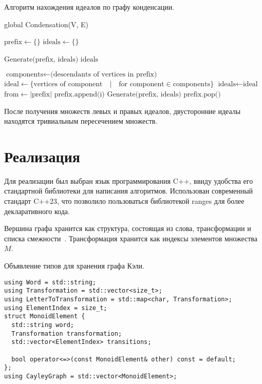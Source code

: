 \documentclass[14pt, russian]{scrartcl}
\begin{document}
\begin{listing}[!htb]
\caption{Алгоритм нахождения идеалов по графу конденсации.}
\label{lst:ideals}
\begin{algorithmic}[1]

\State global Condensation(V, E)

    \State $\text{prefix} \gets \{\}$
    \State $\text{ideals} \gets \{\}$

    \State $\text{Generate(prefix, ideals)}$
    \State \Return $\text{ideals}$
\EndProcedure

    \State $\text{components} \gets \text{(descendants of vertices in prefix)}$
    \State $\text{ideal} \gets \{\text{vertices of component}\quad{} | \quad{} \text{for component} \in \text{components}\}$
    \State $\text{ideals} \gets \text{ideal}$
      \State \Return
    \EndIf
    \State $\text{from} \gets |\text{prefix}|$
        \State $\text{prefix.append(i)}$
        \State $\text{Generate(prefix, ideals)}$
        \State $\text{prefix.pop()}$
    \EndFor
\EndFunction
\end{algorithmic}
\end{listing}

После получения множеств левых и правых идеалов, двусторонние идеалы находятся
тривиальным пересечением множеств.

\newpage
\section{Реализация}

Для реализации был выбран язык программирования C++, ввиду удобства его
стандартной библиотеки для написания алгоритмов. Использован современный
стандарт C++23, что позволило пользоваться библиотекой ranges для более
декларативного кода.

Вершина графа хранится как структура, состоящая из слова, трансформации и списка
смежности~. Трансформация хранится как индексы
элементов множества $M$.

\begin{listing}[!htb]
\caption{Объявление типов для хранения графа Кэли.}
\label{lst:monoid_models}
  \begin{verbatim}
using Word = std::string;
using Transformation = std::vector<size_t>;
using LetterToTransformation = std::map<char, Transformation>;
using ElementIndex = size_t;
struct MonoidElement {
  std::string word;
  Transformation transformation;
  std::vector<ElementIndex> transitions;

  bool operator<=>(const MonoidElement& other) const = default;
};
using CayleyGraph = std::vector<MonoidElement>;
  \end{verbatim}
\end{listing}
\end{document}
